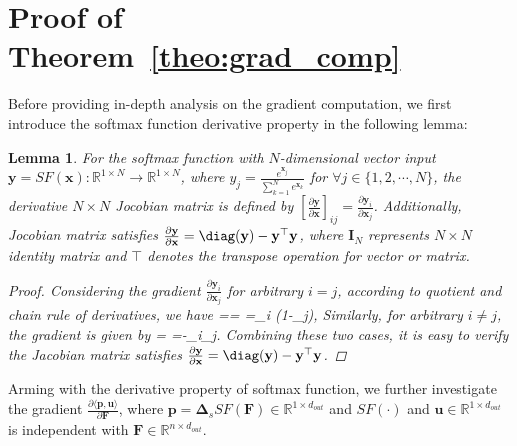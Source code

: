 \documentclass[letterpaper]{article} %
\theoremstyle{plain}
\newtheorem{lemma}[theorem]{Lemma}
\theoremstyle{definition}
\theoremstyle{remark}
\begin{document}
\section{Proof of Theorem~\ref{theo:grad_comp}}
Before providing in-depth analysis on the gradient computation, we first introduce the softmax function derivative property in the following lemma:
\begin{lemma}\label{lemma:softmax}
For the softmax function with $N$-dimensional vector input $\mathbf{y}=SF(\mathbf{x}):\mathbb{R}^{1\times N} \longrightarrow\mathbb{R}^{1\times N}$, where $y_j=\frac{e^{\mathbf{x}_j}}{\sum_{k=1}^{N}e^{\mathbf{x}_k}}$ for $\forall j\in \{1,2,\cdots, N\}$, the derivative $N\times N$ Jocobian matrix is defined by $[\frac{\partial \mathbf{y}}{\partial \mathbf{x}}]_{ij}=\frac{\partial \mathbf{y}_i}{\partial \mathbf{x}_j}$. Additionally, Jocobian matrix satisfies $\frac{\partial \mathbf{y}}{\partial \mathbf{x}}=\diag(\mathbf{y})-\mathbf{y}^{\top}\mathbf{y}$, where $\mathbf{I}_{N}$ represents $N\times N$ identity matrix and $\top$ denotes the transpose operation for vector or matrix.
\begin{proof}
Considering the gradient $\frac{\partial \mathbf{y}_i}{\partial \mathbf{x}_j}$ for arbitrary $i=j$, according to quotient and chain rule of derivatives, we have
\be 
{}== \cdot {}=_i (1-_j),
\ee 
Similarly, for arbitrary $i\neq j$, the gradient is given by
\be 
{}= \cdot {}=-_i_j.
\ee 
Combining these two cases, it is easy to verify the Jacobian matrix satisfies $\frac{\partial \mathbf{y}}{\partial \mathbf{x}}=\diag(\mathbf{y})-\mathbf{y}^{\top}\mathbf{y}$.
\end{proof}
\end{lemma}
Arming with the derivative property of softmax function, we further investigate the gradient $\frac{\partial \langle \mathbf{p}, \mathbf{u}\rangle}{\partial \mathbf{F}}$, where $\mathbf{p}=\mathbf{\Delta}_s SF(\mathbf{F})\in \mathbb{R}^{1\times d_{out}}$ and $SF(\cdot)$ and $\mathbf{u}\in \mathbb{R}^{1\times d_{out}}$ is independent with $\mathbf{F}\in \mathbb{R}^{n\times d_{out}}$. 
\end{document}
